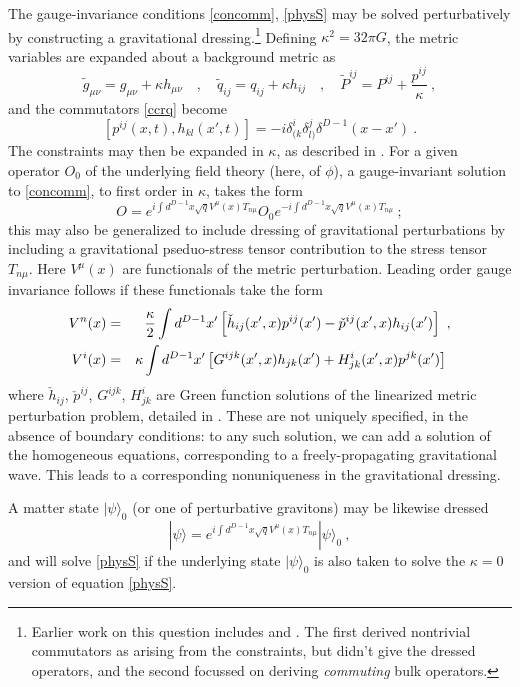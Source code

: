 \documentclass[12pt]{article}
\numberwithin{equation}{section}
\newcommand{\beq}{\begin{equation}}
\newcommand{\eeq}{\end{equation}}
\newcommand{\bea}{\begin{eqnarray}}
\newcommand{\eea}{\end{eqnarray}}
\begin{document}
The gauge-invariance conditions \eqref{concomm}, \eqref{physS} may be solved perturbatively by constructing a gravitational dressing\cite{SGAlg,DoGi1,DoGi2,DoGi3,QGQF,DoGi4,SGsplit}.\footnote{Earlier work on this question includes \cite{Heem} and  \cite{KaLigrav}.   The first derived nontrivial commutators as arising from the constraints, but didn't give the dressed operators, and the second focussed on deriving {\it commuting} bulk operators.}  Defining $\kappa^2=32\pi G$, the metric variables are expanded about a background metric as
\beq
\tilde g_{\mu\nu} = g_{\mu\nu} + \kappa h_{\mu\nu}\quad  , \quad 
\tilde q_{ij}= q_{ij} + \kappa h_{ij}\quad ,\quad
\tilde P^{ij} = P^{ij} + \frac{p^{ij}}{\kappa}\ ,
\eeq
and the commutators \eqref{ccrq} become
\beq\label{Pcom}
[p^{ij}(x,t),h_{kl}(x',t)] = -i \delta^i_{(k}\delta^j_{l)} \delta^{D-1}(x-x')\ .
\eeq
The constraints may then be expanded in $\kappa$, as described in \cite{GiPe2}.  
For a given operator $O_0$ of the underlying field theory (here, of $\phi$), a gauge-invariant solution to \eqref{concomm}, to first order in $\kappa$, takes the form
\beq\label{invO}
O=e^{i\int d^{D-1}x \sqrt{q} V^\mu(x)T_{n\mu} } O_0 e^{-i\int d^{D-1}x \sqrt{q} V^\mu(x) T_{n\mu} }\ ;
\eeq
this may also be generalized to include dressing of gravitational perturbations by including a gravitational pseduo-stress tensor contribution to the stress tensor $T_{n\mu}$.  Here $V^\mu(x)$ are functionals of the metric perturbation.  Leading order gauge invariance follows if these functionals take the form
\bea\label{genv}
V^n(x)&=&\frac{\kappa}{2} \int d^{D-1}x' \left[ \check h_{ij}(x',x) p^{ij}(x') - \check p^{ij}(x',x) h_{ij}(x')\right]\ ,\cr
V^i(x)&=& \kappa \int d^{D-1}x' \left[ G^{ijk}(x',x)h_{jk}(x') + H^i_{jk}(x',x) p^{jk}(x')\right]\ 
\eea
where $\check h_{ij}$,  $\check p^{ij}$, $G^{ijk}$, $H^i_{jk}$ are Green function solutions of the linearized metric perturbation problem, detailed in \cite{GiPe2}.  These are not uniquely specified, in the absence of boundary conditions: to any such solution, we can add a solution of the homogeneous equations, corresponding to a freely-propagating gravitational wave.  This leads to a corresponding nonuniqueness in the gravitational dressing.

A matter state $|\psi\rangle_0$ (or one of perturbative gravitons) may be likewise dressed
\beq\label{GIstate}
|\psi\rangle = e^{i\int d^{D-1}x \sqrt{q} V^\mu(x)T_{n\mu} } |\psi\rangle_0\ ,
\eeq
and will solve \eqref{physS} if the underlying state $|\psi\rangle_0$ is also taken to solve the $\kappa=0$ version of equation \eqref{physS}.
\end{document}
